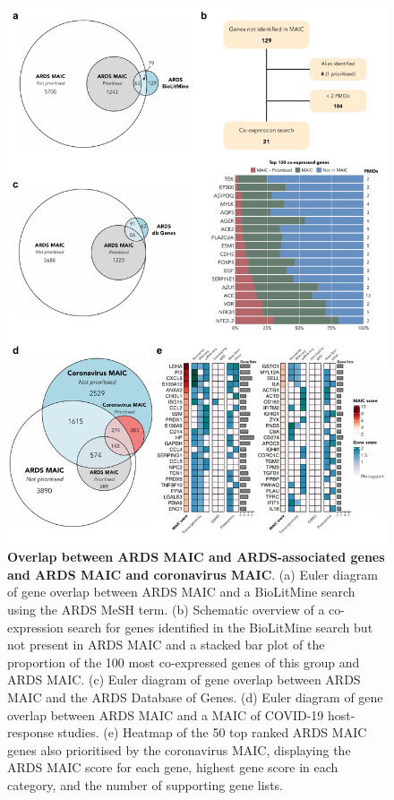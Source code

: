 \documentclass[
  11,
  a4paper,
]{article}
\begin{document}
\begin{figure}[H]

{\centering \includegraphics{../img/Supplementary_Figure_3.png}

}

\caption{\textbf{Overlap between ARDS MAIC and ARDS-associated genes and
ARDS MAIC and coronavirus MAIC}. (a) Euler diagram of gene overlap
between ARDS MAIC and a BioLitMine search using the ARDS MeSH term. (b)
Schematic overview of a co-expression search for genes identified in the
BioLitMine search but not present in ARDS MAIC and a stacked bar plot of
the proportion of the 100 most co-expressed genes of this group and ARDS
MAIC. (c) Euler diagram of gene overlap between ARDS MAIC and the ARDS
Database of Genes. (d) Euler diagram of gene overlap between ARDS MAIC
and a MAIC of COVID-19 host-response studies. (e) Heatmap of the 50 top
ranked ARDS MAIC genes also prioritised by the coronavirus MAIC,
displaying the ARDS MAIC score for each gene, highest gene score in each
category, and the number of supporting gene lists.}

\end{figure}%
\end{document}

